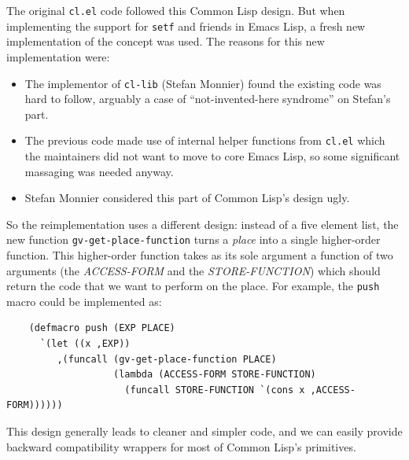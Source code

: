 \documentclass[format=acmsmall, review]{acmart}
\newcommand \Elisp {Emacs Lisp}
\begin{document}
The original \texttt{cl.el} code followed this Common Lisp design.  But when
implementing the support for \texttt{setf} and friends in \Elisp{}, a fresh
new implementation of the concept was used.  The reasons for this new
implementation were:
\begin{itemize}
\item The implementor of \texttt{cl-lib} (Stefan Monnier) found the existing
  code was hard to follow, arguably a case of
  ``not-invented-here syndrome'' on Stefan's part.
\item The previous code made use of internal helper functions from
  \texttt{cl.el} which the maintainers did not want to move to core \Elisp,
  so some significant massaging was needed anyway.
\item Stefan Monnier considered this part of Common Lisp's
  design ugly.
\end{itemize}
So the reimplementation uses a different design: instead of a five element
list, the new function \texttt{gv-get-place-function} turns
a \emph{place}  into a single higher-order function.
This higher-order function takes as its sole argument a function
of two arguments (the \textsl{ACCESS-FORM} and the \textsl{STORE-FUNCTION})
which should return the code that we want to perform on the place.
For example, the \texttt{push} macro could be implemented as:
\begin{verbatim}
    (defmacro push (EXP PLACE)
      `(let ((x ,EXP))
         ,(funcall (gv-get-place-function PLACE)
                   (lambda (ACCESS-FORM STORE-FUNCTION)
                     (funcall STORE-FUNCTION `(cons x ,ACCESS-FORM))))))
\end{verbatim}
This design generally leads to cleaner and simpler code, and we can easily
provide backward compatibility wrappers for most of Common Lisp's
primitives.
\end{document}
